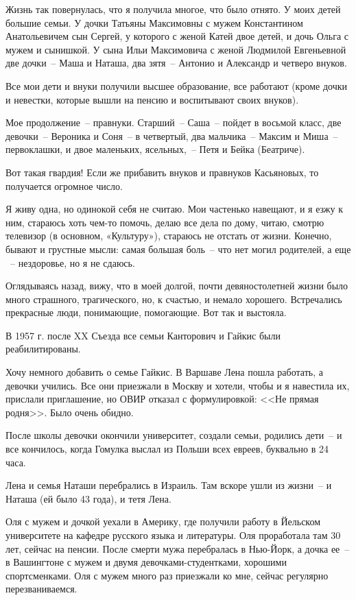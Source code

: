 Жизнь  так повернулась,  что  я  получила многое,  что было отнято.  У  моих 
детей  большие  семьи.  У дочки  Татьяны  Максимовны  с мужем  Константином 
Анатольевичем  сын Сергей,  у которого с женой Катей  двое детей, и  дочь Ольга  с мужем  и  сынишкой. У сына  Ильи Максимовича с женой  Людмилой  Евгеньевной 
две дочки~--  Маша и Наташа,  два  зятя~--  Антонио  и  Александр  и четверо внуков.

Все  мои  дети  и  внуки получили  высшее образование,  все  работают  (кроме 
дочки и невестки, которые вышли на пенсию и воспитывают своих  внуков).

Мое  продолжение~-- правнуки.  Старший~-- Саша~--  пойдет  в  восьмой  класс, 
две девочки~-- Вероника и Соня~-- в четвертый,  два  мальчика~-- Максим  и  Миша~-- 
первоклашки, и двое маленьких, ясельных,~--  Петя и Бейка (Беатриче).

Вот  такая  гвардия!  Если же  прибавить внуков и правнуков  Касьяновых,  то 
получается огромное число.

Я живу  одна,  но  одинокой  себя  не считаю. Мои  частенько  навещают, и  я 
езжу  к  ним,  стараюсь  хоть  чем-то помочь,  делаю  все  дела по  дому,  читаю, 
смотрю  телевизор  (в основном, «Культуру»),  стараюсь  не  отстать  от  жизни. 
Конечно, бывают  и  грустные  мысли:  самая  большая  боль~--  что  нет  могил 
родителей, а еще ~-- нездоровье, но я не сдаюсь.

Оглядываясь  назад, вижу, что в  моей  долгой, почти  девяностолетней  жизни 
было  много  страшного,  трагического,  но,  к  счастью,  и  немало  хорошего. 
Встречались прекрасные люди, понимающие, помогающие. Вот так и выстояла.

В  1957 г.  после  XX  Съезда  все  семьи  Канторович  и  Гайкис  были 
реабилитированы.

Хочу  немного  добавить  о семье  Гайкис.  В Варшаве Лена пошла работать, а 
девочки учились. Все  они приезжали в Москву и хотели,  чтобы  и  я навестила их, 
прислали  приглашение, но  ОВИР отказал  с  формулировкой:  <<Не прямая родня>>. 
Было очень обидно.

После школы девочки окончили университет, создали  семьи,  родились  дети~-- 
и все  кончилось, когда  Гомулка выслал  из  Польши  всех евреев, буквально в 24 
часа.

Лена и  семья  Наташи  перебрались  в Израиль. Там вскоре ушли из жизни~--  и 
Наташа (ей было 43 года), и тетя Лена.

Оля с мужем и дочкой уехали в  Америку,  где  получили  работу в Йельском 
университете  на кафедре  русского языка  и литературы.  Оля проработала там 30 
лет, сейчас на пенсии. После смерти мужа перебралась  в Нью-Йорк, а дочка ее~--  в 
Вашингтоне с мужем и двумя девочками-студентками,  хорошими спортсменками. 
Оля с мужем много раз приезжали ко мне, сейчас регулярно перезваниваемся.